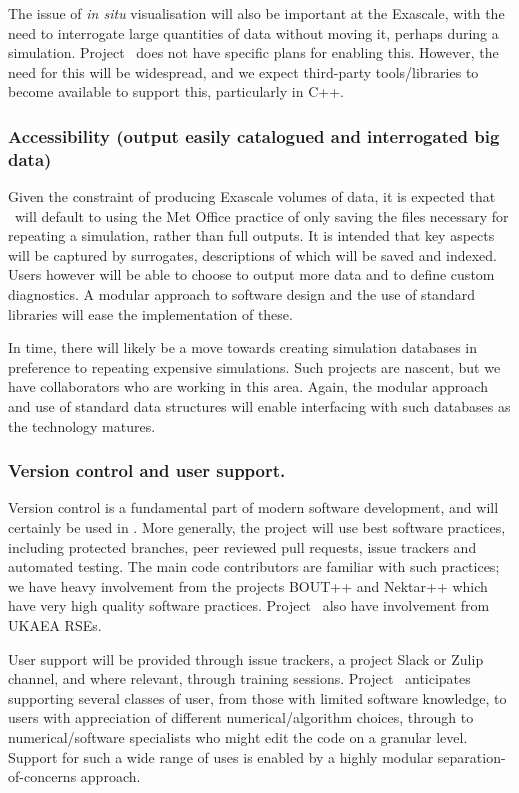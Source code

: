 The issue of \emph{in situ} visualisation will also be important at the Exascale,
with the need to interrogate large quantities of data without moving it,
perhaps during a simulation.
Project \nep \ does not have specific plans for enabling this.
However, the need for this will be widespread, and we expect third-party
tools/libraries to become available to support this, particularly in C++.

\subsubsection{Accessibility (output easily catalogued and interrogated  big data)}
Given the constraint of producing Exascale volumes of data,
it is expected that \nep\ will default to using the Met Office practice of only
saving the files necessary for repeating a simulation, rather than full
outputs.
It is intended that key aspects will be captured by surrogates, descriptions of
which will be saved and indexed.
Users however will be able to choose to output more data and to define
custom diagnostics.
A modular approach to software design and the use of standard libraries will
ease the implementation of these.

In time, there will likely be a move towards creating
simulation databases in preference to repeating expensive simulations.
Such projects are nascent, but we have collaborators who are working in this
area.
Again, the modular approach and use of standard data structures will enable
interfacing with such databases as the technology matures.


\subsubsection{Version control and user support.}
Version control is a fundamental part of modern software development, and will
certainly be used in \nep.
More generally, the project will use best software practices, including
protected branches, peer reviewed pull requests, issue trackers and automated
testing.
The main code contributors are familiar with such practices; we have heavy
involvement from the projects BOUT++ and Nektar++ which have very high quality
software practices.
Project \nep \ also have involvement from UKAEA RSEs.

User support will be provided through issue trackers, a project Slack or Zulip channel,
and where relevant, through training sessions.
Project \nep \ anticipates supporting several classes of user, from
those with limited software knowledge,
to users with appreciation of different numerical/algorithm choices,
through to numerical/software specialists who might edit the code on a granular
level.
Support for such a wide range of uses is enabled by a highly modular
separation-of-concerns approach.

